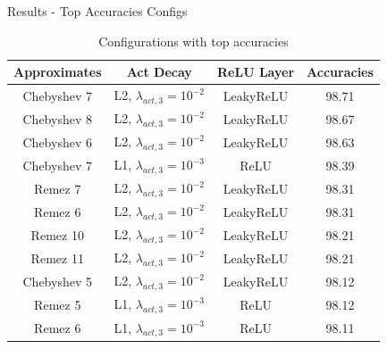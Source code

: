 \documentclass[9pt]{beamer}
\begin{document}
\begin{frame}{Results - Top Accuracies Configs}
    \begin{table}[h]
        \center
        \begin{tabular}{|c|c|c|c|} \hline
            Approximates        & Act Decay                             & ReLU Layer        & Accuracies    \\ \hline
            \alert{Chebyshev 7} & \alert{L2, $\lambda_{act,3}=10^{-2}$} & \alert{LeakyReLU} & \alert{98.71} \\
            Chebyshev 8         & L2, $\lambda_{act,3}=10^{-2}$         & LeakyReLU         & 98.67         \\
            Chebyshev 6         & L2, $\lambda_{act,3}=10^{-2}$         & LeakyReLU         & 98.63         \\
            \alert{Chebyshev 7} & \alert{L1, $\lambda_{act,3}=10^{-3}$} & \alert{ReLU}      & \alert{98.39} \\
            \alert{Remez 7}     & \alert{L2, $\lambda_{act,3}=10^{-2}$} & \alert{LeakyReLU} & \alert{98.31} \\
            Remez 6             & L2, $\lambda_{act,3}=10^{-2}$         & LeakyReLU         & 98.31         \\
            Remez 10            & L2, $\lambda_{act,3}=10^{-2}$         & LeakyReLU         & 98.21         \\
            Remez 11            & L2, $\lambda_{act,3}=10^{-2}$         & LeakyReLU         & 98.21         \\
            Chebyshev 5         & L2, $\lambda_{act,3}=10^{-2}$         & LeakyReLU         & 98.12         \\
            \alert{Remez 5}     & \alert{L1, $\lambda_{act,3}=10^{-3}$} & \alert{ReLU}      & \alert{98.12} \\
            Remez 6             & L1, $\lambda_{act,3}=10^{-3}$         & ReLU              & 98.11         \\
            \hline
        \end{tabular}
        \caption{Configurations with top accuracies}
        \label{table:top_acc}
    \end{table}
\end{frame}
\end{document}
